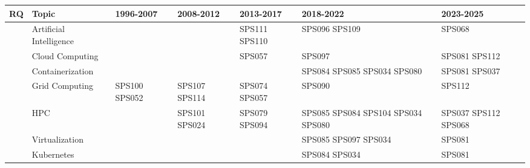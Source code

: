 \begin{table}
	{\fontsize{7}{10}\selectfont
		\renewcommand{\arraystretch}{1.2}
		\setlength{\tabcolsep}{3pt}
		\begin{tabular}{>{\raggedright\arraybackslash}p{0.7cm}>{\raggedright\arraybackslash}p{2.5cm}>{\raggedright\arraybackslash}p{2.5cm}>{\raggedright\arraybackslash}p{2.5cm}>{\raggedright\arraybackslash}p{2.5cm}>{\raggedright\arraybackslash}p{2.5cm}>{\raggedright\arraybackslash}p{2.5cm}}
			\toprule
			\textbf{RQ}                    & \textbf{Topic}          & \textbf{1996-2007} & \textbf{2008-2012}   & \textbf{2013-2017}          & \textbf{2018-2022}                               & \textbf{2023-2025}          \\
			\midrule
			\multirow{11}{*}{\textbf{RQ1}} & Artificial Intelligence &                    &                      & SPS111 SPS110               & SPS096 SPS109                                    & SPS068                      \\
			                               & Cloud Computing         &                    &                      & SPS057                      & SPS097                                           & SPS081 SPS112               \\
			                               & Containerization        &                    &                      &                             & SPS084 SPS085 SPS034 SPS080                      & SPS081 SPS037               \\
			                               & Grid Computing          & SPS100 SPS052      & SPS107 SPS114        & SPS074 SPS057               & SPS090                                           & SPS112                      \\
			                               & HPC                     &                    & SPS101 SPS024        & SPS079 SPS094               & SPS085 SPS084 SPS104 SPS034 SPS080               & SPS037 SPS112 SPS068        \\
			                               & Virtualization          &                    &                      &                             & SPS085 SPS097 SPS034                             & SPS081                      \\
			                               & Kubernetes              &                    &                      &                             & SPS084 SPS034                                    & SPS081                      \\

\end{tabular}}
\end{table}
